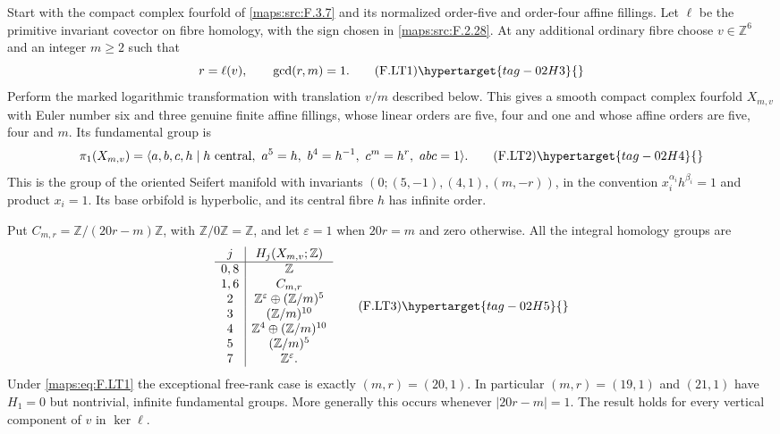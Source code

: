 \begin{theorem}\hypertarget{tag-02NN}{}\label{maps:src:F.2.32}


Start with the compact complex fourfold of \ref{maps:src:F.3.7} and its
normalized order-five and order-four affine fillings.
Let $\ell$ be the primitive invariant covector on fibre
homology, with the sign chosen in \ref{maps:src:F.2.28}.
At any additional ordinary fibre choose
$v\in\mathbb Z^6$ and an integer $m\ge2$ such that
\[
 r=\ell(v),\qquad \gcd(r,m)=1.
\tag{F.LT1}\hypertarget{tag-02H3}{}\label{maps:eq:F.LT1}
\]
Perform the marked logarithmic transformation with
translation $v/m$ described below.
This gives a smooth compact complex fourfold $X_{m,v}$
with Euler number six and three genuine finite affine
fillings, whose linear orders are five, four and one
and whose affine orders are five, four and $m$.
Its fundamental group is
\[
 \pi_1(X_{m,v})=
 \langle a,b,c,h\mid h\text{ central},\
   a^5=h,\ b^4=h^{-1},\ c^m=h^r,\ abc=1\rangle .
\tag{F.LT2}\hypertarget{tag-02H4}{}\label{maps:eq:F.LT2}
\]
This is the group of the oriented Seifert manifold
with invariants
$(0;(5,-1),(4,1),(m,-r))$, in the convention
$x_i^{\alpha_i}h^{\beta_i}=1$ and product $x_i=1$.
Its base orbifold is hyperbolic, and its central fibre
$h$ has infinite order.

Put $C_{m,r}=\mathbb Z/(20r-m)\mathbb Z$, with
$\mathbb Z/0\mathbb Z=\mathbb Z$, and let
$\varepsilon=1$ when $20r=m$ and zero otherwise.
All the integral homology groups are
\[
\begin{array}{c|c}
j&H_j(X_{m,v};\mathbb Z)\\ \hline
0,8&\mathbb Z\\
1,6&C_{m,r}\\
2&\mathbb Z^\varepsilon\oplus(\mathbb Z/m)^5\\
3&(\mathbb Z/m)^{10}\\
4&\mathbb Z^4\oplus(\mathbb Z/m)^{10}\\
5&(\mathbb Z/m)^5\\
7&\mathbb Z^\varepsilon .
\end{array}
\tag{F.LT3}\hypertarget{tag-02H5}{}\label{maps:eq:F.LT3}
\]
Under \eqref{maps:eq:F.LT1} the exceptional free-rank case is exactly
$(m,r)=(20,1)$.
In particular $(m,r)=(19,1)$ and $(21,1)$ have
$H_1=0$ but nontrivial, infinite fundamental groups.
More generally this occurs whenever $|20r-m|=1$.
The result holds for every vertical component of $v$ in $\ker\ell$.

\end{theorem}


